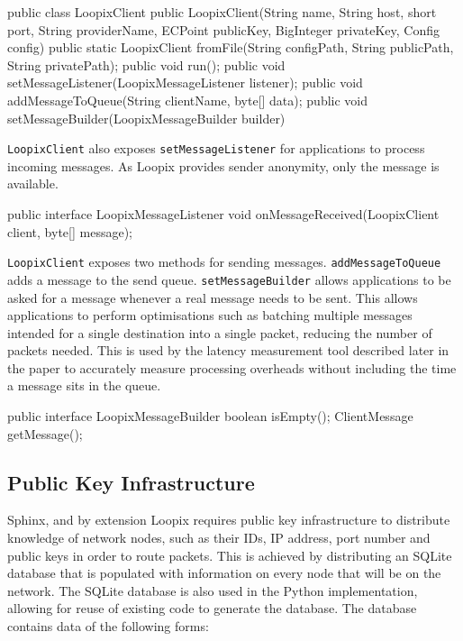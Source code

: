 \documentclass[final,dissertation.tex]{subfiles}
\begin{document}
\begin{javacode}
public class LoopixClient {
    public LoopixClient(String name, String host, short port, 
        String providerName, ECPoint publicKey, BigInteger privateKey, 
        Config config)
    public static LoopixClient fromFile(String configPath, 
        String publicPath, String privatePath);
    public void run();
    public void setMessageListener(LoopixMessageListener listener);
    public void addMessageToQueue(String clientName, byte[] data);
    public void setMessageBuilder(LoopixMessageBuilder builder)
}
\end{javacode}

\verb|LoopixClient| also exposes \verb|setMessageListener| for applications to process incoming messages. As Loopix provides sender anonymity, only the message is available.

\begin{javacode}
public interface LoopixMessageListener {
	void onMessageReceived(LoopixClient client, byte[] message);
}
\end{javacode}

\verb|LoopixClient| exposes two methods for sending messages. \verb|addMessageToQueue| adds a message to the send queue. \verb|setMessageBuilder| allows applications to be asked for a message whenever a real message needs to be sent. This allows applications to perform optimisations such as batching multiple messages intended for a single destination into a single packet, reducing the number of packets needed. This is used by the latency measurement tool described later in the paper to accurately measure processing overheads without including the time a message sits in the queue.

\begin{javacode}
public interface LoopixMessageBuilder {
	boolean isEmpty();
	ClientMessage getMessage();
}
\end{javacode}

\subsection{Public Key Infrastructure}

Sphinx, and by extension Loopix requires public key infrastructure to distribute knowledge of network nodes, such as their IDs, IP address, port number and public keys in order to route packets. This is achieved by distributing an SQLite database that is populated with information on every node that will be on the network. The SQLite database is also used in the Python implementation, allowing for reuse of existing code to generate the database. The database contains data of the following forms:
\end{document}
